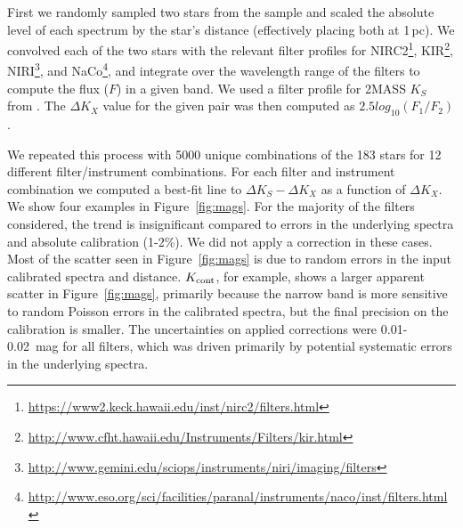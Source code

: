 \documentclass[twocolumn]{aastex62}
\begin{document}
First we randomly sampled two stars from the sample and scaled the absolute level of each spectrum by the star's distance (effectively placing both at 1\,pc). We convolved each of the two stars with the relevant filter profiles for NIRC2\footnote{\href{https://www2.keck.hawaii.edu/inst/nirc2/filters.html}{https://www2.keck.hawaii.edu/inst/nirc2/filters.html}}, KIR\footnote{\href{http://www.cfht.hawaii.edu/Instruments/Filters/kir.html}{http://www.cfht.hawaii.edu/Instruments/Filters/kir.html}}, NIRI\footnote{\href{http://www.gemini.edu/sciops/instruments/niri/imaging/filters}{http://www.gemini.edu/sciops/instruments/niri/imaging/filters}}, and NaCo\footnote{\href{http://www.eso.org/sci/facilities/paranal/instruments/naco/inst/filters.html}{http://www.eso.org/sci/facilities/paranal/instruments/naco/inst/filters.html}}, and integrate over the wavelength range of the filters to compute the flux ($F$) in a given band. We used a filter profile for 2MASS $K_S$ from \citet{2003AJ....126.1090C}. The $\Delta K_X$ value for the given pair was then computed as $2.5log_{10}(F_1/F_2)$. 

We repeated this process with 5000 unique combinations of the 183 stars for 12 different filter/instrument combinations. For each filter and instrument combination we computed a best-fit line to $\Delta K_S -\Delta K_X$ as a function of $\Delta K_X$. We show four examples in Figure~\ref{fig:mags}. For the majority of the filters considered, the trend is insignificant compared to errors in the underlying spectra and absolute calibration (1-2\%). We did not apply a correction in these cases. Most of the scatter seen in Figure~\ref{fig:mags} is due to random errors in the input calibrated spectra and distance. $K_{\rm{cont}}$, for example, shows a larger apparent scatter in Figure~\ref{fig:mags}, primarily because the narrow band is more sensitive to random Poisson errors in the calibrated spectra, but the final precision on the calibration is smaller. The uncertainties on applied corrections were 0.01-0.02~mag for all filters, which was driven primarily by potential systematic errors in the underlying spectra. 
\end{document}
